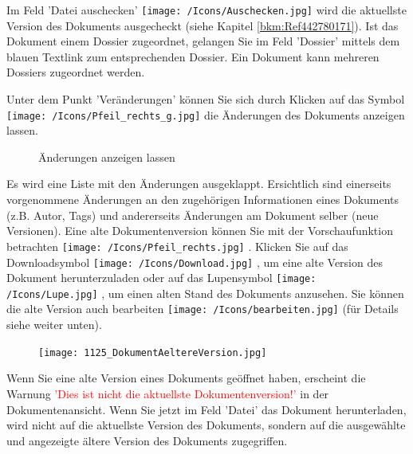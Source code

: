Im Feld 'Datei auschecken' \texttt{[image: /Icons/Auschecken.jpg]}  wird die aktuellste Version des Dokuments ausgecheckt (siehe Kapitel \ref{bkm:Ref442780171}). Ist das Dokument einem Dossier zugeordnet, gelangen Sie im Feld 'Dossier' mittels dem blauen Textlink  zum entsprechenden Dossier. Ein Dokument kann mehreren Dossiers zugeordnet werden. \newline

\vspace{\baselineskip}

Unter dem Punkt 'Veränderungen' können Sie sich durch Klicken auf das Symbol \texttt{[image: /Icons/Pfeil\_rechts\_g.jpg]}  die Änderungen des Dokuments anzeigen lassen.

\begin{figure}[H]
\caption{Änderungen anzeigen lassen}
\end{figure}

Es wird eine Liste mit den Änderungen ausgeklappt. Ersichtlich sind einerseits vorgenommene Änderungen an den zugehörigen Informationen eines Dokuments (z.B. Autor, Tags) und andererseits Änderungen am Dokument selber (neue Versionen). Eine alte Dokumentenversion können Sie mit der Vorschaufunktion betrachten \texttt{[image: /Icons/Pfeil\_rechts.jpg]} . Klicken Sie auf das Downloadsymbol \texttt{[image: /Icons/Download.jpg]} , um eine alte Version des Dokument herunterzuladen oder auf das Lupensymbol \texttt{[image: /Icons/Lupe.jpg]} , um einen alten Stand des Dokuments anzusehen. Sie können die alte Version auch bearbeiten \texttt{[image: /Icons/bearbeiten.jpg]}  (für Details siehe weiter unten).\newline

\begin{figure}
\vspace{-25pt}
\texttt{[image: 1125\_DokumentAeltereVersion.jpg]}
\end{figure}
Wenn Sie eine alte Version eines Dokuments geöffnet haben, erscheint die Warnung \textcolor{red}{'Dies ist nicht die aktuellste Dokumentenversion!'} in der Dokumentenansicht. Wenn Sie jetzt im Feld 'Datei' das Dokument herunterladen, wird nicht auf die aktuellste Version des Dokuments, sondern auf die ausgewählte und angezeigte ältere Version des Dokuments zugegriffen.

